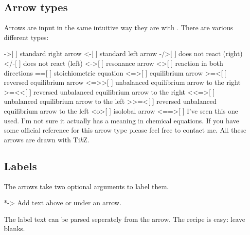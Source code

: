 \documentclass[load-preamble+]{cnltx-doc}
\makeatletter
\newcommand*\cf@arrow{%
  \@ifstar
    {\cf@arrow@star}
    {\cf@arrow@nostar}%
}
\newenvironment{arrows}
  {%
    \let\arrow\cf@arrow
    \cnltxlist
  }
  {\endcnltxlist}
\newcommand*\TikZ{Ti\textit{k}Z}
\makeatother
\begin{document}
\subsection{Arrow types}
Arrows are input in the same intuitive way they are with .
There are various different types:
\begin{arrows}
  \arrow{->}[ \charrow{->}]
    standard right arrow
  \arrow{<-}[ \charrow{<-}]
    standard left arrow
  \arrow{-/>}[ \charrow{-/>}]
    does not react (right)
  \arrow{</-}[ \charrow{</-}]
    does not react (left)
  \arrow{<->}[ \charrow{<->}]
    resonance arrow
  \arrow{<>}[ \charrow{<>}]
    reaction in both directions
  \arrow{==}[ \charrow{==}]
    stoichiometric equation
  \arrow{<=>}[ \charrow{<=>}]
    equilibrium arrow
  \arrow{>=<}[ \charrow{>=<}]
    reversed equilibrium arrow
  \arrow{<=>>}[ \charrow{<=>>}]
    unbalanced equilibrium arrow to the right
  \arrow{>=<<}[ \charrow{>=<<}]
    reversed unbalanced equilibrium arrow to the right
  \arrow{<<=>}[ \charrow{<<=>}]
    unbalanced equilibrium arrow to the left
  \arrow{>>=<}[ \charrow{>>=<}]
    reversed unbalanced equilibrium arrow to the left
  \arrow{<o>}[ ]
    isolobal arrow
  \arrow{<==>}[ \charrow{<==>}]
    I've seen this one used. I'm not sure it actually has a meaning in
    chemical equations.  If you have some official reference for this arrow
    type please feel free to contact me.
\end{arrows}
All these arrows are drawn with \TikZ.
\begin{example}
   \par
   \par
   \par
  \ch{\{[CH2=CH-CH2]- <-> {}[CH2-CH=CH2]- \}} \par
   \par
   \par
\end{example}

\subsection{Labels}
The arrows take two optional arguments to label them.
\begin{arrows}
  \arrow*{->}
    Add text above or under an arrow.
\end{arrows}
\begin{example}
   \par
   \par
\end{example}
The label text can be parsed seperately from the arrow. The recipe is easy:
leave blanks.
\begin{example}
   \par
   \par
   \par
\end{example}
\end{document}
